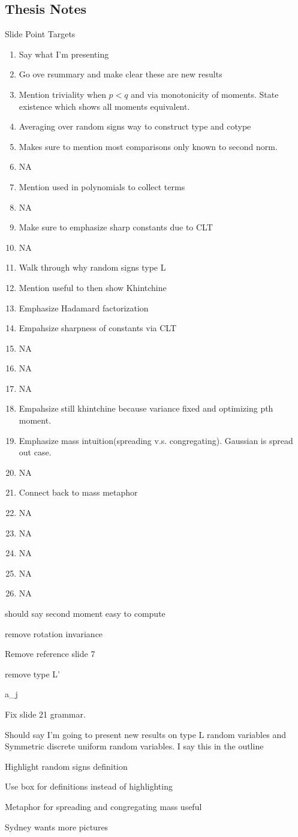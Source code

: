 \documentclass[11pt]{article}
\theoremstyle{remark}
\begin{document}
\subsection{Thesis Notes}

Slide Point Targets
\begin{enumerate}
	\item Say what I'm presenting
	\item Go ove rsummary and make clear these are new results
	\item Mention triviality when $p < q$ and via monotonicity of moments. State existence which shows all moments equivalent.
	\item Averaging over random signs way to construct type and cotype
	\item Makes sure to mention most comparisons only known to second norm. 
	\item NA
	\item Mention used in polynomials to collect terms
	\item NA
	\item Make sure to emphasize sharp constants due to CLT
	\item NA
	\item Walk through why random signs type L
	\item Mention useful to then show Khintchine
	\item Emphasize Hadamard factorization
	\item Empahsize sharpness of constants via CLT
	\item NA
	\item NA
	\item NA
	\item Empahsize still khintchine because variance fixed and optimizing pth moment.
	\item Emphasize mass intuition(spreading v.s. congregating). Gaussian is spread out case.
	\item NA
	\item Connect back to mass metaphor
	\item NA
	\item NA
	\item NA
	\item NA
	\item NA
\end{enumerate}

should say second moment easy to compute

remove rotation invariance

Remove reference slide 7

remove type L'

a_j

Fix slide 21 grammar.

Should say I'm going to present new results on type L random variables and Symmetric discrete uniform random variables. I say this in the outline

Highlight random signs definition

Use box for definitions instead of highlighting

Metaphor for spreading and congregating mass useful

Sydney wants more pictures
\end{document}
